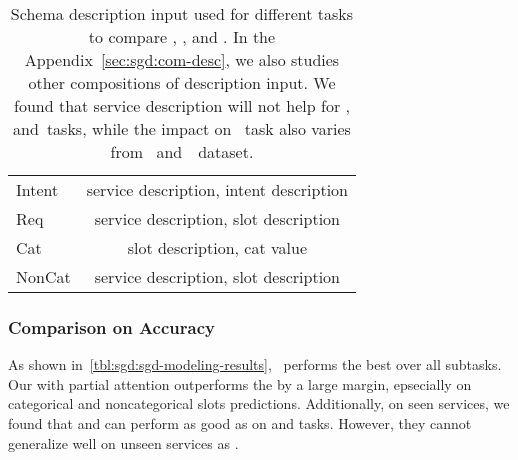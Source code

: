 \begin{table}[!t]
\caption{\label{tbl:sgd:schema-seq} Schema description input used for
  different tasks to compare \DE, \CE, and \FE. In the
  Appendix~\ref{sec:sgd:com-desc}, we also studies other compositions of
description input. We found that service description will not help for
\IC, \RSI and~\CSL tasks, while the impact on \NSL~task also varies
from \sgdst~and~\multiwoz~dataset.}
\begin{center}
\setlength{\tabcolsep}{3pt}
\begin{tabular}{l|c}
  \toprule
\hline
Intent & service description, intent description \\
Req    & service description, slot description   \\
Cat    & slot description, cat value             \\
NonCat & service description, slot description   \\
\hline
  \bottomrule
\end{tabular}
\end{center}
\end{table}


\subsubsection{Comparison on Accuracy}
\label{sssec:sgd:enc-results}
As shown in~\autoref{tbl:sgd:sgd-modeling-results},
\CE~performs the best over all subtasks. Our \FE with partial
attention outperforms the \DE by a large margin, epsecially on
categorical and noncategorical slots predictions. Additionally, on
seen services, we found that \DE and \FE can perform as good as \CE on
\IC and \RSI tasks. However, they cannot generalize well on unseen
services as \CE. %

